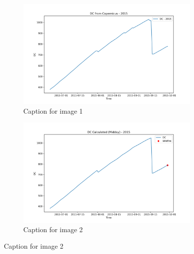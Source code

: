 \begin{figure}[h]
\caption{HELLo}
    \centering
    \begin{subfigure}{0.49\textwidth}
        \centering
        \includegraphics[width=\textwidth]{graphs/2015/2015CopernicusDC12.png}
        \caption{Caption for image 1}
        \label{fig:img1}
    \end{subfigure}
    \hfill
    \begin{subfigure}{0.49\textwidth}
        \centering
        \includegraphics[width=\textwidth]{graphs/2015/2015CalcDC12.png}
        \caption{Caption for image 2}
        \label{fig:img2}
    \end{subfigure}
    \label{fig:both_images}
\end{figure}

